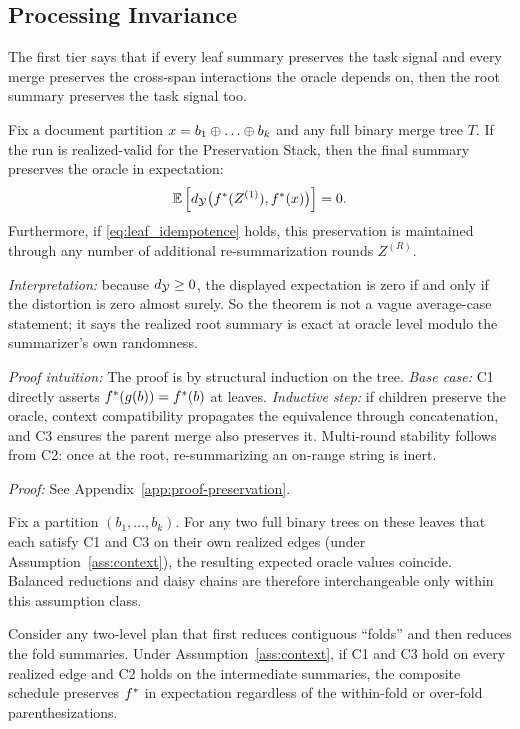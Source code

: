 \subsection{Processing Invariance}

The first tier says that if every leaf summary preserves the task signal and every merge preserves the cross-span interactions the oracle depends on, then the root summary preserves the task signal too.

\begin{theorem}\label{thm:one-pass}
Fix a document partition $x = b_1 \concat \dots \concat b_k$ and any full binary merge tree $T$. If the run is realized-valid for the Preservation Stack, then the final summary preserves the oracle in expectation:
\[
\mathbb{E}\left[d_{\mathcal{Y}}\big(f^\ast(Z^{(1)}), f^\ast(x)\big)\right] = 0.
\]
Furthermore, if \ref{eq:leaf_idempotence} holds, this preservation is maintained through any number of additional re-summarization rounds $Z^{(R)}$.
\end{theorem}

\noindent\textit{Interpretation:} because $d_{\mathcal{Y}} \ge 0$, the displayed expectation is zero if and only if the distortion is zero almost surely. So the theorem is not a vague average-case statement; it says the realized root summary is exact at oracle level modulo the summarizer's own randomness.

\noindent\textit{Proof intuition:} The proof is by structural induction on the tree. \emph{Base case:} C1 directly asserts $f^\ast(g(b)) = f^\ast(b)$ at leaves. \emph{Inductive step:} if children preserve the oracle, context compatibility propagates the equivalence through concatenation, and C3 ensures the parent merge also preserves it. Multi-round stability follows from C2: once at the root, re-summarizing an on-range string is inert.

\noindent\textit{Proof:} See Appendix~\ref{app:proof-preservation}.

\begin{corollary}\label{cor:schedule}
Fix a partition $(b_1, \ldots, b_k)$. For any two full binary trees on these leaves that each satisfy C1 and C3 on their own realized edges (under Assumption~\ref{ass:context}), the resulting expected oracle values coincide. Balanced reductions and daisy chains are therefore interchangeable only within this assumption class.
\end{corollary}

\begin{corollary}\label{cor:folds}
Consider any two-level plan that first reduces contiguous ``folds'' and then reduces the fold summaries. Under Assumption~\ref{ass:context}, if C1 and C3 hold on every realized edge and C2 holds on the intermediate summaries, the composite schedule preserves $f^\ast$ in expectation regardless of the within-fold or over-fold parenthesizations.
\end{corollary}

